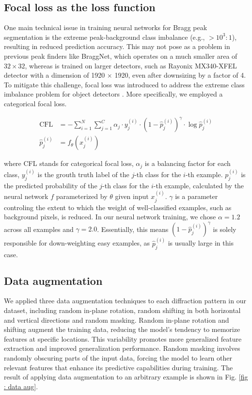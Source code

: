 \documentclass[a4paper]{article}
\begin{document}
\subsection{Focal loss as the loss function}

One main technical issue in training neural networks for Bragg peak segmentation
is the extreme peak-background class imbalance (e.g., $> 10^3 : 1$), resulting
in reduced prediction accuracy.  This may not pose as a problem in previous peak
finders like BraggNet, which operates on a much smaller area of $32 \times 32$,
whereas \peaknet{} is trained on larger detectors, such as Rayonix MX340-XFEL
detector with a dimension of 1920 $\times$ 1920, even after downsizing by a
factor of 4.  To mitigate this challenge, focal loss was introduced to address
the extreme class imbalance problem for object detectors
\citep{linFocalLossDense2018}.  More specifically, we employed a categorical
focal loss.

\begin{align}
\text{CFL} &= - \sum_{i = 1}^{N}\sum_{j = 1}^{C} 
            \alpha_j \cdot y_j^{(i)} \cdot (1-\hat{p}_j^{(i)})^\gamma 
            \cdot \log{\hat{p}_j^{(i)}} \\
\hat{p}_j^{(i)} &= f_\theta(x_j^{(i)})
\end{align}

where CFL stands for categorical focal loss, $\alpha_j$ is a balancing factor
for each class, $y_j^{(i)}$ is the grouth truth label of the $j$-th class for
the $i$-th example.  $p_j^{(i)}$ is the predicted probability of the $j$-th
class for the $i$-th example, calculated by the neural network $f$ parameterized
by $\theta$ given input $x_j^{(i)}$.  $\gamma$ is a parameter controling the
extent to which the weight of well-classified examples, such as background
pixels, is reduced.  In our neural network training, we chose $\alpha = 1.2$
across all examples and $\gamma = 2.0$.  Essentially, this means $(1-\hat{p}
_j^{(i)}) ^\gamma$ is solely responsible for down-weighting easy examples, as
$\hat{p} _j^{(i)}$ is usually large in this case.  


\subsection{Data augmentation}

We applied three data augmentation techniques to each diffraction pattern in our
dataset, including random in-plane rotation, random shifting in both horizontal
and vertical directions and random masking.  Random in-plane rotation and
shifting augment the training data, reducing the model's tendency to memorize
features at specific locations.  This variability promotes more generalized
feature extraction and improved generalization performance.  Random masking
involves randomly obscuring parts of the input data, forcing the model to learn
other relevant features that enhance its predictive capabilities during
training.  The result of applying data augmentation to an arbitrary example is
shown in Fig. \ref{fig : data aug}.
\end{document}
